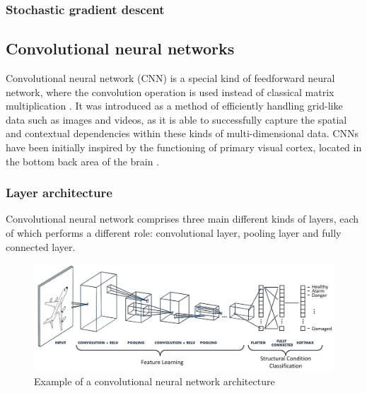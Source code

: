 \subsubsection*{Stochastic gradient descent}

\subsection{Convolutional neural networks}
Convolutional neural network (CNN) is a special kind of feedforward neural network, where the convolution operation is used instead of classical matrix multiplication \cite{deeplearningbook}. It was introduced as a method of efficiently handling grid-like data such as images and videos, as it is able to successfully capture the spatial and contextual dependencies within these kinds of 
multi-dimensional data. CNNs have been initially inspired by the functioning of primary visual cortex, located in the bottom back area of the brain \cite{deeplearningbook}.
\subsubsection{Layer architecture}
Convolutional neural network comprises three main different kinds of layers, each of which performs a different role: convolutional layer, pooling layer and fully connected layer.
\begin{figure}[!ht]
\centering
\includegraphics[width=15cm]{assets/images/CNN}
\caption{Example of a convolutional neural network architecture 
\label{fig:CNN}}
\end{figure}

